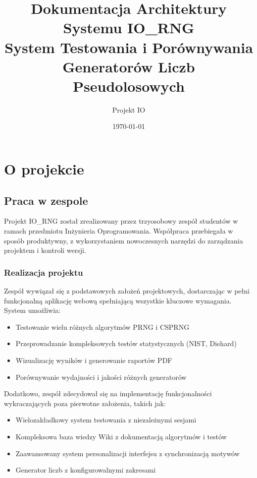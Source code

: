 \documentclass[12pt,a4paper]{article}
\title{\textbf{Dokumentacja Architektury Systemu IO\_RNG}\\
\large System Testowania i Porównywania Generatorów Liczb Pseudolosowych}
\author{Projekt IO}
\date{\today}
\begin{document}
\maketitle
\tableofcontents
\newpage

\section{O projekcie}

\subsection{Praca w zespole}

Projekt IO\_RNG został zrealizowany przez trzyosobowy zespół studentów w ramach przedmiotu Inżynieria Oprogramowania. Współpraca przebiegała w sposób produktywny, z wykorzystaniem nowoczesnych narzędzi do zarządzania projektem i kontroli wersji.

\subsubsection{Realizacja projektu}

Zespół wywiązał się z podstawowych założeń projektowych, dostarczając w pełni funkcjonalną aplikację webową spełniającą wszystkie kluczowe wymagania. System umożliwia:

\begin{itemize}
    \item Testowanie wielu różnych algorytmów PRNG i CSPRNG
    \item Przeprowadzanie kompleksowych testów statystycznych (NIST, Diehard)
    \item Wizualizację wyników i generowanie raportów PDF
    \item Porównywanie wydajności i jakości różnych generatorów
\end{itemize}

Dodatkowo, zespół zdecydował się na implementację funkcjonalności wykraczających poza pierwotne założenia, takich jak:
\begin{itemize}
    \item Wielozakładkowy system testowania z niezależnymi sesjami
    \item Kompleksowa baza wiedzy Wiki z dokumentacją algorytmów i testów
    \item Zaawansowany system personalizacji interfejsu z synchronizacją motywów
    \item Generator liczb z konfigurowalnymi zakresami
\end{itemize}
\end{document}

